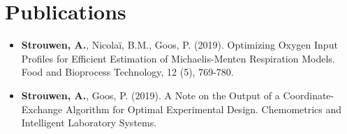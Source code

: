 \chapter*{Publications} 
\begin{itemize}
	\item \textbf{Strouwen, A.}, Nicolaï, B.M., Goos, P. (2019). Optimizing Oxygen Input Profiles for Efficient Estimation of Michaelis-Menten Respiration Models. Food and Bioprocess Technology, 12 (5), 769-780.
	\item \textbf{Strouwen, A.}, Goos, P. (2019). A Note on the Output of a Coordinate-Exchange Algorithm for Optimal Experimental Design. Chemometrics and Intelligent Laboratory Systems.
\end{itemize}